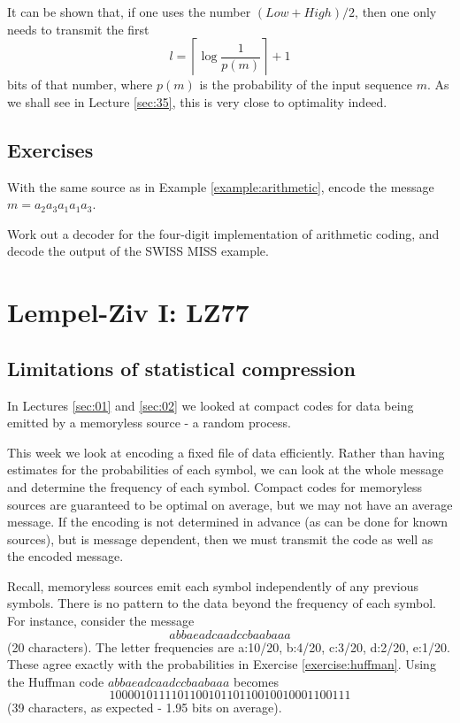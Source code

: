 \documentclass[a4paper, 11pt, openany]{book}
\begin{document}
It can be shown that, if one uses the number $(Low + High)/2$, then one only needs to transmit the first
\[
    l = \left\lceil \log \frac{1}{p(m)} \right\rceil + 1
\]
bits of that number, where $p(m)$ is the probability of the input sequence $m$. As we shall see in Lecture \ref{sec:35}, this is very close to optimality indeed.

\subsection{Exercises}

\begin{exercise} \label{exercise:arithmetic}
With the same source as in Example \ref{example:arithmetic}, encode the message $m = a_2a_3a_1a_1a_3$.
\end{exercise}



\begin{exercise} \label{exercise:swiss_miss}
Work out a decoder for the four-digit implementation of arithmetic coding, and decode the output of the SWISS MISS example.
\end{exercise}

\section{Lempel-Ziv I: LZ77}
\label{sec:03}


\subsection{Limitations of statistical compression}

In Lectures \ref{sec:01} and \ref{sec:02} we looked at compact codes for data being emitted by a memoryless source - a random process.

This week we look at encoding a fixed file of data efficiently. Rather than having estimates for the probabilities of each symbol, we can look at the whole message and determine the frequency of each symbol. Compact codes for memoryless sources are guaranteed to be optimal on average, but we may not have an average message. If the encoding is not determined in advance (as can be done for known sources), but is message dependent, then we must transmit the code as well as the encoded message.

Recall, memoryless sources emit each symbol independently of any previous symbols. There is no pattern to the data beyond the frequency of each symbol. For instance, consider the message
\[
    abbaeadcaadccbaabaaa
\]
(20 characters). The letter frequencies are a:10/20, b:4/20, c:3/20, d:2/20, e:1/20. These agree exactly with the probabilities in Exercise \ref{exercise:huffman}. Using the Huffman code $abbaeadcaadccbaabaaa$ becomes
\[
    100001011110110010110110010010001100111
\]
(39 characters, as expected - 1.95 bits on average).
\end{document}
